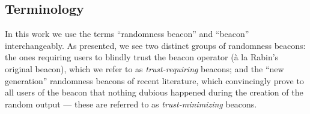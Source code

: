 \subsection{Terminology}
In this work we use the terms \enquote{randomness beacon} and \enquote{beacon} interchangeably.
As presented, we see two distinct groups of randomness beacons: the ones requiring users to blindly trust the beacon operator (à la Rabin's original beacon), which we refer to as \emph{trust-requiring} beacons; and the \enquote{new generation} randomness beacons of recent literature, which convincingly prove to all users of the beacon that nothing dubious happened during the creation of the random output --- these are referred to as \emph{trust-minimizing} beacons.

